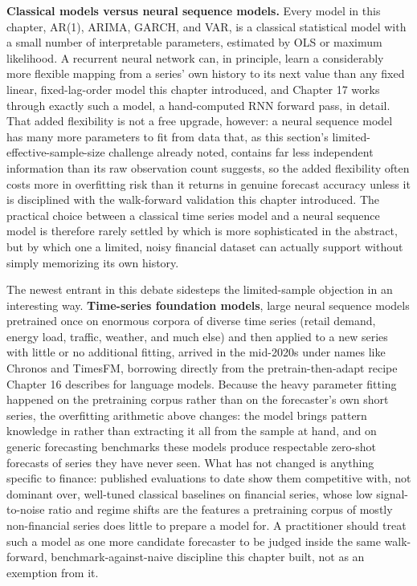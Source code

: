 \documentclass[../ai_in_finance]{subfiles}
\begin{document}
\textbf{Classical models versus neural sequence models.} Every model in this chapter, AR(1), ARIMA, GARCH, and VAR, is a classical statistical model with a small number of interpretable parameters, estimated by OLS or maximum likelihood. A recurrent neural network can, in principle, learn a considerably more flexible mapping from a series' own history to its next value than any fixed linear, fixed-lag-order model this chapter introduced, and Chapter 17 works through exactly such a model, a hand-computed RNN forward pass, in detail.
That added flexibility is not a free upgrade, however: a neural sequence model has many more parameters to fit from data that, as this section's limited-effective-sample-size challenge already noted, contains far less independent information than its raw observation count suggests, so the added flexibility often costs more in overfitting risk than it returns in genuine forecast accuracy unless it is disciplined with the walk-forward validation this chapter introduced.
The practical choice between a classical time series model and a neural sequence model is therefore rarely settled by which is more sophisticated in the abstract, but by which one a limited, noisy financial dataset can actually support without simply memorizing its own history.

The newest entrant in this debate sidesteps the limited-sample objection in an interesting way. \textbf{Time-series foundation models}, large neural sequence models pretrained once on enormous corpora of diverse time series (retail demand, energy load, traffic, weather, and much else) and then applied to a new series with little or no additional fitting, arrived in the mid-2020s under names like Chronos and TimesFM, borrowing directly from the pretrain-then-adapt recipe Chapter 16 describes for language models. Because the heavy parameter fitting happened on the pretraining corpus rather than on the forecaster's own short series, the overfitting arithmetic above changes: the model brings pattern knowledge in rather than extracting it all from the sample at hand, and on generic forecasting benchmarks these models produce respectable zero-shot forecasts of series they have never seen. What has not changed is anything specific to finance: published evaluations to date show them competitive with, not dominant over, well-tuned classical baselines on financial series, whose low signal-to-noise ratio and regime shifts are the features a pretraining corpus of mostly non-financial series does little to prepare a model for. A practitioner should treat such a model as one more candidate forecaster to be judged inside the same walk-forward, benchmark-against-naive discipline this chapter built, not as an exemption from it.
\end{document}
